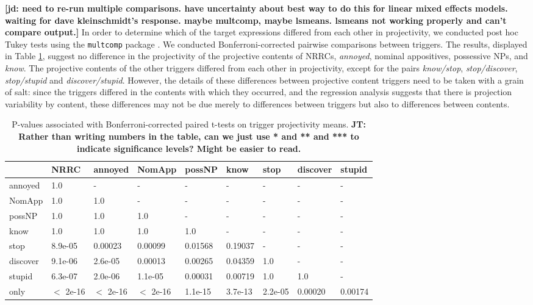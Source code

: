 \documentclass[11pt,fleqn]{article}
\newcommand{\6}{\mbox{$[\hspace*{-.6mm}[$}}
\newcommand{\9}{\mbox{$]\hspace*{-.6mm}]$}}
\newcommand{\tableref}[1]{Table \ref{#1}}
\newcommand{\jt}[1]{\textbf{\color{blue}JT: #1}}
\newcommand{\jd}[1]{\textbf{\color{Green}[jd: #1]}}
\begin{document}
\jd{need to re-run multiple comparisons. have uncertainty about best way to do this for linear mixed effects models. waiting for dave kleinschmidt's response. maybe multcomp, maybe lsmeans. lsmeans not working properly and can't compare output.}
In order to determine which of the target expressions differed from each other in projectivity, we conducted post hoc Tukey tests using the \verb|multcomp| package \citep{tukey}. We conducted Bonferroni-corrected pairwise comparisons between triggers. The results, displayed in \tableref{tab:pairwise}, suggest no difference in the projectivity of the projective contents of NRRCs, \emph{annoyed}, nominal appositives, possessive NPs, and \emph{know}. The projective contents of the other triggers differed from each other in projectivity, except for the pairs \emph{know/stop}, \emph{stop/discover}, \emph{stop/stupid} and \emph{discover/stupid}. However, the details of these differences between projective content triggers need to be taken with a grain of salt: since the triggers differed in the contents with which they occurred, and the regression analysis suggests that there is projection variability by content, these differences may not be due merely to differences between triggers but also to differences between contents.


\begin{table}[!h]
\begin{center}
\begin{tabular}{l l l l l l l l l}
\toprule
 &   NRRC & annoyed & NomApp &  possNP &  know & stop & discover & stupid \\
 \midrule
annoyed &  1.0  &  -  &        -   &       -  &        -  &   - &     -   &  -\\     
NomApp  &  1.0 & 1.0 & -    &   -   &    -    &   -  &     -   & - \\    
possNP  &    1.0 & 1.0 & 1.0 & - &      -  &     -     &  -   & - \\    
know     &   1.0 & 1.0 & 1.0 & 1.0 & -   &    -   &    -       & -\\
stop     &   8.9e-05 & 0.00023 & 0.00099 & 0.01568 & 0.19037 & - &  - & -\\      
discover  &   9.1e-06 & 2.6e-05 & 0.00013 & 0.00265 & 0.04359 & 1.0 & - & -      \\
stupid    &  6.3e-07 & 2.0e-06 & 1.1e-05 & 0.00031 & 0.00719 & 1.0 & 1.0 & - \\
only      &  $<$ 2e-16 & $<$ 2e-16 & $<$ 2e-16 & 1.1e-15 & 3.7e-13 & 2.2e-05 & 0.00020 & 0.00174 \\
\bottomrule
\end{tabular}

\caption{P-values associated with Bonferroni-corrected paired t-tests on trigger projectivity means. \jt{Rather than writing numbers in the table, can we just use * and ** and *** to indicate significance levels? Might be easier to read.}}
\label{tab:pairwise}
\end{center}
\end{table}
\end{document}
